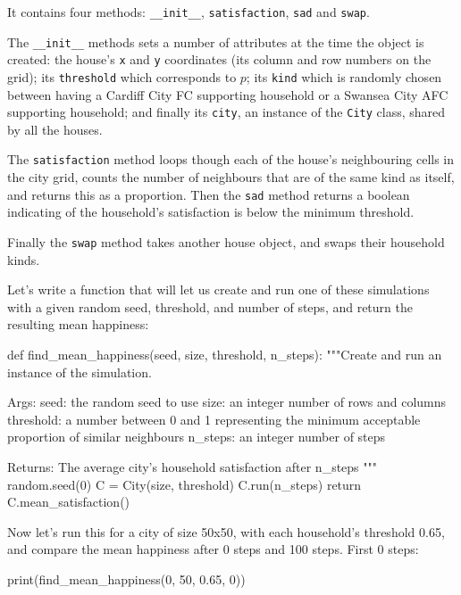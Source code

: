 It contains four methods: \texttt{__init__},
\texttt{satisfaction}, \texttt{sad} and
\texttt{swap}.

The \texttt{__init__} methods sets a number of attributes at the
time the object is created: the house's \texttt{x} and
\texttt{y} coordinates (its column and row numbers on the grid);
its \texttt{threshold} which corresponds to $p$; its
\texttt{kind} which is randomly chosen between having a Cardiff City
FC supporting household or a Swansea City AFC supporting household; and finally
its \texttt{city}, an instance of the \texttt{City}
class, shared by all the houses.

The \texttt{satisfaction} method loops though each of the house's
neighbouring cells in the city grid, counts the number of neighbours that are
of the same kind as itself, and returns this as a proportion.
Then the \texttt{sad} method returns a boolean indicating of the
household's satisfaction is below the minimum threshold.

Finally the \texttt{swap} method takes another house object, and
swaps their household kinds.

Let's write a function that will let us create and run one of these simulations
with a given random seed, threshold, and number of steps, and return the
resulting mean happiness:

\begin{pyin}
def find_mean_happiness(seed, size, threshold, n_steps):
    """Create and run an instance of the simulation.

    Args:
        seed: the random seed to use
        size: an integer number of rows and columns
        threshold: a number between 0 and 1 representing
            the minimum acceptable proportion of similar
            neighbours
        n_steps: an integer number of steps

    Returns:
        The average city's household satisfaction after
        n_steps
    """
    random.seed(0)
    C = City(size, threshold)
    C.run(n_steps)
    return C.mean_satisfaction()
\end{pyin}

Now let's run this for a city of size 50x50, with each household's threshold
0.65, and compare the mean happiness after 0 steps and 100 steps.
First 0 steps:

\begin{pyin}
print(find_mean_happiness(0, 50, 0.65, 0))
\end{pyin}


